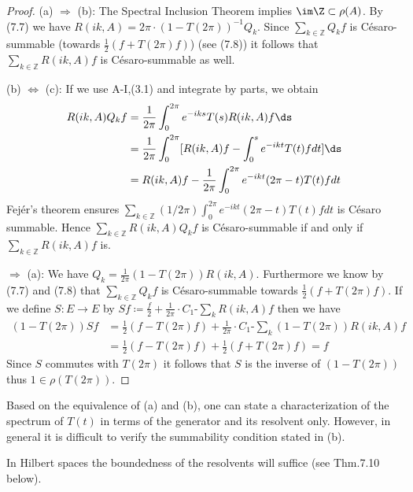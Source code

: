 \begin{proof}
(a) $\Rightarrow$ (b): The Spectral Inclusion Theorem implies $\im\Z \subset \rho(A)$.
By (7.7) we have $R(ik,A) = 2\pi\cdot(1-T(2\pi))^{-1}Q_{k}$.
Since $\sum_{k\in\mathbb{Z}} Q_{k}f$ is Césaro-summable (towards $\frac{1}{2}(f + T(2\pi)f)$) (see (7.8)) it follows that $\sum_{k\in\mathbb{Z}} R(ik,A)f$ is Césaro-summable as well.

(b) $\Leftrightarrow$ (c): If we use A-I,(3.1) and integrate by parts, we obtain
\begin{align*}
R(ik,A)Q_{k}f &= \frac{1}{2\pi}\int_{0}^{2\pi} e^{-iks} T(s)R(ik,A)f \ds \\
&= \frac{1}{2\pi}\int_{0}^{2\pi} [R(ik,A)f - \int_{0}^{s} e^{-ikt} T(t)f dt] \ds \\
&= R(ik,A)f - \frac{1}{2\pi}\int_{0}^{2\pi} e^{-ikt} (2\pi-t) T(t)f dt
\end{align*}
Fejér's theorem ensures $\sum_{k\in\mathbb{Z}} (1/2\pi)\int_{0}^{2\pi} e^{-ikt} (2\pi-t) T(t)f dt$ is Césaro summable.
Hence $\sum_{k\in\mathbb{Z}} R(ik,A)Q_{k}f$ is Césaro-summable if and only if $\sum_{k\in\mathbb{Z}} R(ik,A)f$ is.

$\Rightarrow$ (a): We have $Q_{k} = \frac{1}{2\pi}(1 - T(2\pi))R(ik,A)$.
Furthermore we know by (7.7) and (7.8) that $\sum_{k\in\mathbb{Z}} Q_{k}f$ is Césaro-summable towards $\frac{1}{2}(f + T(2\pi)f)$.
If we define $S \colon E \to E$ by $Sf \coloneqq \frac{f}{2} + \frac{1}{2\pi}\cdot C_{1}\text{-}\sum_k R(ik,A)f$ then we have
\begin{align*}
(1 - T(2\pi))Sf &= \frac{1}{2}(f - T(2\pi)f) + \frac{1}{2\pi}\cdot C_{1}\text{-}\sum_k (1 - T(2\pi))R(ik,A)f \\
&= \frac{1}{2}(f - T(2\pi)f) + \frac{1}{2}(f + T(2\pi)f) = f
\end{align*}
Since $S$ commutes with $T(2\pi)$ it follows that $S$ is the inverse of $(1 - T(2\pi))$ thus $1 \in \rho(T(2\pi))$.
\end{proof}

Based on the equivalence of (a) and (b), one can state a characterization of the spectrum of $T(t)$ in terms of the generator and its resolvent only.
However, in general it is difficult to verify the summability condition stated in (b).

In Hilbert spaces the boundedness of the resolvents will suffice (see Thm.7.10 below).

